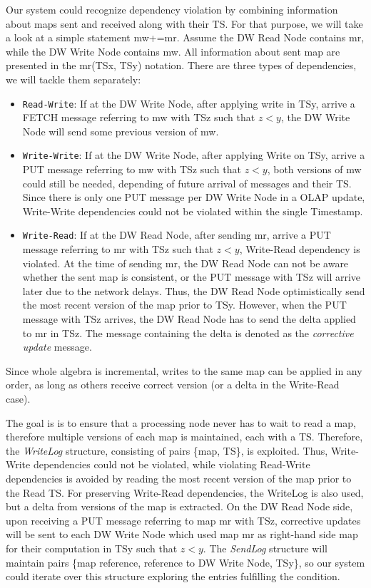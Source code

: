 \documentclass{sig-semester}
\def\OLAP{OLAP\xspace}
\begin{document}
Our system could recognize dependency violation by combining information about maps sent and received along with their TS. For that purpose, we will take a look at a simple statement mw+=mr. Assume the DW Read Node contains mr, while the DW Write Node contains mw. All information about sent map are presented in the mr(TSx, TSy) notation. There are three types of dependencies, we will tackle them separately:

\begin{itemize} 
 \item \texttt{Read-Write}:  If at the DW Write Node, after applying write in TSy, arrive a FETCH message referring to mw with TSz such that $z<y$, the DW Write Node will send some previous version of mw.

 \item \texttt{Write-Write}: If at the DW Write Node, after applying Write on TSy, arrive a PUT message referring to mw with TSz such that $z<y$, both versions of mw could still be needed, depending of future arrival of messages and their TS. Since there is only one PUT message per DW Write Node in a \OLAP update, Write-Write dependencies could not be violated within the single Timestamp.
 
 \item \texttt{Write-Read}:  If at the DW Read Node, after sending mr, arrive a PUT message referring to mr with TSz such that $z<y$, Write-Read dependency is violated. At the time of sending mr, the DW Read Node can not be aware whether the sent map is consistent, or the PUT message with TSz will arrive later due to the network delays. Thus, the DW Read Node optimistically send the most recent version of the map prior to TSy. However, when the PUT message with TSz arrives, the DW Read Node has to send the delta applied to mr in TSz. The message containing the delta is denoted as the \textit{corrective update} message.

\end{itemize}

Since whole algebra is incremental, writes to the same map can be applied in any order, as long as others receive correct version (or a delta in the Write-Read case).

The goal is is to ensure that a processing node never has to wait to read a map, therefore multiple versions of each map is maintained, each with a TS. Therefore, the \textit{WriteLog} structure, consisting of pairs \{map, TS\}, is exploited. Thus, Write-Write dependencies could not be violated, while violating Read-Write dependencies is avoided by reading the most recent version of the map prior to the Read TS. For preserving Write-Read dependencies, the WriteLog is also used, but a delta from versions of the map is extracted. On the DW Read Node side, upon receiving a PUT message referring to map mr with TSz, corrective updates will be sent to each DW Write Node which used map mr as right-hand side map for their computation in TSy such that $z<y$. The \textit{SendLog} structure will maintain pairs \{map reference, reference to DW Write Node, TSy\}, so our system could iterate over this structure exploring the entries fulfilling the condition.
\end{document}
